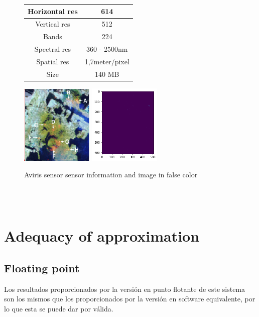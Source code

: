 \begin{figure}[!ht]
    \begin{tabular}[b]{c|c}\hline
      Horizontal res & 614 \\ \hline
      Vertical res & 512 \\ \hline
      Bands & 224 \\ \hline
      Spectral res & 360 - 2500nm \\ \hline
      Spatial res & 1,7meter/pixel \\ \hline
      Size & 140 MB\\ \hline
    \end{tabular}
\includegraphics[height=1.5in]{figures/wtc_bad.png}
\includegraphics[height=1.5in]{figures/wtc_rx.png}
    \caption{Aviris sensor sensor information and image in false color}
  \end{figure}
\\
\\
\section{Adequacy of approximation}
\subsection{Floating point}
Los resultados proporcionados por la versión en punto flotante de este sistema son los mismos que los proporcionados por la versión en software equivalente, por lo que esta se puede dar por válida.

